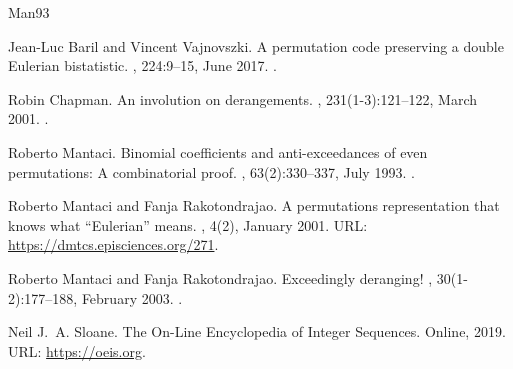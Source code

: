 \documentclass[reqno]{amsart}
\theoremstyle{definition}
\begin{document}
\begin{thebibliography}{Man93}

Jean-Luc Baril and Vincent Vajnovszki.
\newblock A permutation code preserving a double {E}ulerian bistatistic.
, 224:9--15, June 2017.
\newblock \href {https://doi.org/10.1016/j.dam.2017.02.014}
  {}.

Robin Chapman.
\newblock An involution on derangements.
, 231(1-3):121--122, March 2001.
\newblock \href {https://doi.org/10.1016/s0012-365x(00)00310-1}
  {}.

Roberto Mantaci.
\newblock Binomial coefficients and anti-exceedances of even permutations: A
  combinatorial proof.
, 63(2):330--337, July
  1993.
\newblock \href {https://doi.org/10.1016/0097-3165(93)90064-f}
  {}.

Roberto Mantaci and Fanja Rakotondrajao.
\newblock A permutations representation that knows what ``{E}ulerian'' means.
, 4(2),
  January 2001.
\newblock URL: \url{https://dmtcs.episciences.org/271}.

Roberto Mantaci and Fanja Rakotondrajao.
\newblock Exceedingly deranging!
, 30(1-2):177--188, February
  2003.
\newblock \href {https://doi.org/10.1016/s0196-8858(02)00531-6}
  {}.

Neil J.~A. Sloane.
\newblock The {O}n-{L}ine {E}ncyclopedia of {I}nteger {S}equences.
\newblock Online, 2019.
\newblock URL: \url{https://oeis.org}.


\end{thebibliography}
\end{document}
